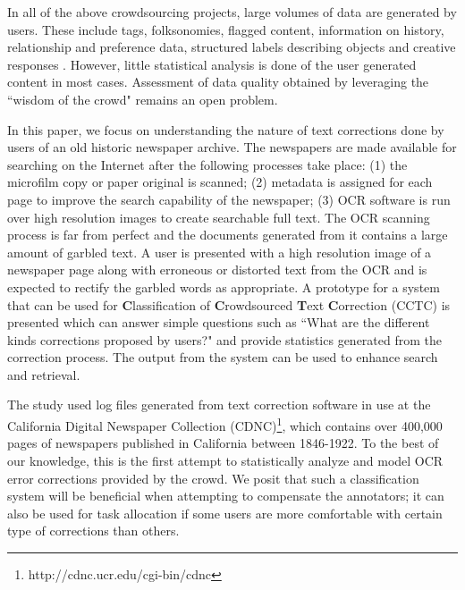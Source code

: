 \documentclass[letterpaper]{article}
\begin{document}
In all of the above crowdsourcing projects, large volumes of data are generated by users. These include tags, folksonomies, flagged content, information on history, relationship and preference data, structured labels describing objects and creative responses \cite{Ridge_11}. However, little statistical analysis is done of the user generated content in most cases. Assessment of data quality obtained by leveraging the ``wisdom of the crowd" remains an open problem. 


In this paper, we focus on understanding the nature of text corrections done by users of an old historic newspaper archive. The newspapers are made available for searching on the Internet after the following processes take place: (1) the microfilm copy or paper original is scanned; %
(2) metadata is assigned for each page to improve the search capability of the newspaper; (3) OCR software is run over high resolution images to create searchable full text.
The OCR scanning process is far from perfect and the documents generated from it contains a large amount of garbled text. A user is presented with a high resolution image of a newspaper page along with erroneous or distorted text from the OCR and is expected to rectify the garbled words as appropriate. A prototype for a system that can be used for \textbf{C}lassification of \textbf{C}rowdsourced \textbf{T}ext \textbf{C}orrection (CCTC) is presented which can answer simple questions such as ``What are the different kinds corrections proposed by users?" and provide statistics generated from the correction process. The output from the system can be used to enhance search and retrieval.

The study used log files generated from text correction software in use at the California Digital Newspaper Collection (CDNC)\footnote{http://cdnc.ucr.edu/cgi-bin/cdnc}, which contains over 400,000 pages of newspapers published in California between 1846-1922. 
To the best of our knowledge, this is the first attempt to statistically analyze and model OCR error corrections provided by the crowd. We posit that such a classification system will be beneficial when attempting to compensate the annotators; it can also be used for task allocation if some users are more comfortable with certain type of corrections than others.
\end{document}
